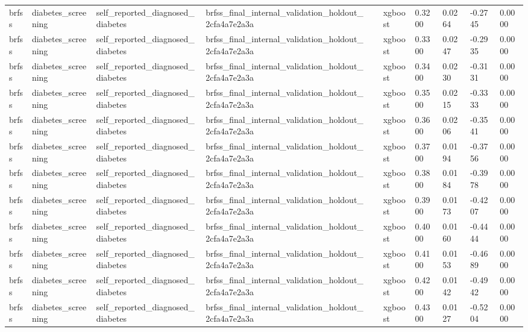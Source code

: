 \begin{tabular}{llllllllll}
brfss & diabetes\_screening & self\_reported\_diagnosed\_diabetes & brfss\_final\_internal\_validation\_holdout\_2cfa4a7e2a3a &  & xgboost & 0.3200 & 0.0264 & -0.2745 & 0.0000 \\
brfss & diabetes\_screening & self\_reported\_diagnosed\_diabetes & brfss\_final\_internal\_validation\_holdout\_2cfa4a7e2a3a &  & xgboost & 0.3300 & 0.0247 & -0.2935 & 0.0000 \\
brfss & diabetes\_screening & self\_reported\_diagnosed\_diabetes & brfss\_final\_internal\_validation\_holdout\_2cfa4a7e2a3a &  & xgboost & 0.3400 & 0.0230 & -0.3131 & 0.0000 \\
brfss & diabetes\_screening & self\_reported\_diagnosed\_diabetes & brfss\_final\_internal\_validation\_holdout\_2cfa4a7e2a3a &  & xgboost & 0.3500 & 0.0215 & -0.3333 & 0.0000 \\
brfss & diabetes\_screening & self\_reported\_diagnosed\_diabetes & brfss\_final\_internal\_validation\_holdout\_2cfa4a7e2a3a &  & xgboost & 0.3600 & 0.0206 & -0.3541 & 0.0000 \\
brfss & diabetes\_screening & self\_reported\_diagnosed\_diabetes & brfss\_final\_internal\_validation\_holdout\_2cfa4a7e2a3a &  & xgboost & 0.3700 & 0.0194 & -0.3756 & 0.0000 \\
brfss & diabetes\_screening & self\_reported\_diagnosed\_diabetes & brfss\_final\_internal\_validation\_holdout\_2cfa4a7e2a3a &  & xgboost & 0.3800 & 0.0184 & -0.3978 & 0.0000 \\
brfss & diabetes\_screening & self\_reported\_diagnosed\_diabetes & brfss\_final\_internal\_validation\_holdout\_2cfa4a7e2a3a &  & xgboost & 0.3900 & 0.0173 & -0.4207 & 0.0000 \\
brfss & diabetes\_screening & self\_reported\_diagnosed\_diabetes & brfss\_final\_internal\_validation\_holdout\_2cfa4a7e2a3a &  & xgboost & 0.4000 & 0.0160 & -0.4444 & 0.0000 \\
brfss & diabetes\_screening & self\_reported\_diagnosed\_diabetes & brfss\_final\_internal\_validation\_holdout\_2cfa4a7e2a3a &  & xgboost & 0.4100 & 0.0153 & -0.4689 & 0.0000 \\
brfss & diabetes\_screening & self\_reported\_diagnosed\_diabetes & brfss\_final\_internal\_validation\_holdout\_2cfa4a7e2a3a &  & xgboost & 0.4200 & 0.0142 & -0.4942 & 0.0000 \\
brfss & diabetes\_screening & self\_reported\_diagnosed\_diabetes & brfss\_final\_internal\_validation\_holdout\_2cfa4a7e2a3a &  & xgboost & 0.4300 & 0.0127 & -0.5204 & 0.0000 \\

\end{tabular}
